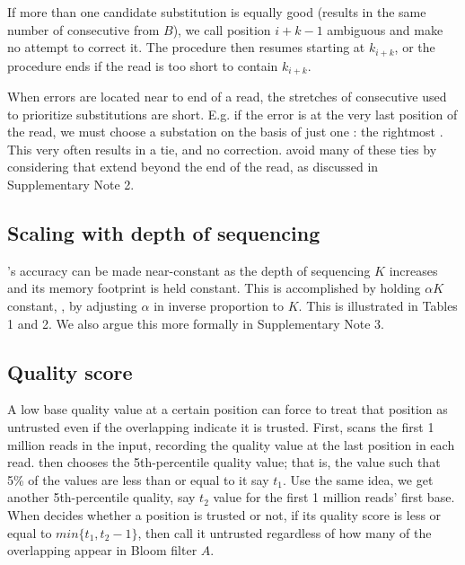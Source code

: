 \documentclass{bmcart}
\begin{document}
If more than one candidate substitution is equally good (\thatis results in the same number of consecutive \kmers from $B$), we call position $i+k-1$ ambiguous and make no attempt to correct it.
The procedure then resumes starting at $k_{i+k}$, or the procedure ends if the read is too short to contain \kmer $k_{i+k}$.



When errors are located near to end of a read, the stretches of consecutive \kmers used to prioritize substitutions are short.  E.g. if the error is at the very last position of the read, we must choose a substation on the basis of just one \kmer: the rightmost \kmer.  This very often results in a tie, and no correction.  \tool avoid many of these ties by considering \kmers that extend beyond the end of the read, as discussed in Supplementary Note 2.

\subsection*{Scaling with depth of sequencing}
\tool's accuracy can be made near-constant as the depth of sequencing $K$ increases and its memory footprint is held constant.  This is accomplished by holding $\alpha K$ constant, \thatis, by adjusting $\alpha$ in inverse proportion to $K$.  This is illustrated in Tables 1 and 2.  We also argue this more formally in Supplementary Note 3.

\subsection*{Quality score}
A low base quality value at a certain position can force \tool to treat that position as untrusted even if the overlapping \kmers indicate it is trusted.  First, \tool scans the first 1 million reads in the input, recording the quality value at the last position in each read.  \tool then chooses the 5th-percentile quality value; that is, the value such that 5\% of the values are less than or equal to it say $t_1$. Use the same idea, we get another 5th-percentile quality, say $t_2$ value for the first 1 million reads' first base. When \tool decides whether a position is trusted or not, if its quality score is less or equal to $min\{t_1, t_2 - 1\}$, then call it untrusted regardless of how many of the overlapping \kmers appear in Bloom filter $A$. 
\end{document}
